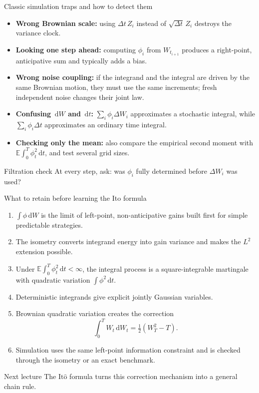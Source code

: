 \documentclass[handout,10pt,aspectratio=169]{beamer}
\newcommand{\E}{\mathbb E}
\newcommand{\dd}{\,\mathrm d}
\newcommand{\Ito}{\mathrm{It\hat{o}}}
\begin{document}
\begin{frame}{Classic simulation traps and how to detect them}
\footnotesize
\begin{itemize}\setlength{\itemsep}{0.3em}
  \item \textbf{Wrong Brownian scale:} using \(\Delta t\,Z_i\) instead of \(\sqrt{\Delta t}\,Z_i\) destroys the variance clock.
  \item \textbf{Looking one step ahead:} computing \(\phi_i\) from \(W_{t_{i+1}}\) produces a right-point, anticipative sum and typically adds a bias.
  \item \textbf{Wrong noise coupling:} if the integrand and the integral are driven by the same Brownian motion, they must use the same increments; fresh independent noise changes their joint law.
  \item \textbf{Confusing \(\dd W\) and \(\dd t\):} \(\sum_i\phi_i\Delta W_i\) approximates a stochastic integral, while \(\sum_i\phi_i\Delta t\) approximates an ordinary time integral.
  \item \textbf{Checking only the mean:} also compare the empirical second moment with \(\E\int_0^T\phi_t^2\dd t\), and test several grid sizes.
\end{itemize}
\begin{alertblock}{Filtration check}
At every step, ask: was \(\phi_i\) fully determined before \(\Delta W_i\) was used?
\end{alertblock}
\end{frame}

\begin{frame}{What to retain before learning the Ito formula}
\small
\begin{enumerate}\setlength{\itemsep}{0.25em}
  \item \(\int\phi\dd W\) is the limit of left-point, non-anticipative gains built first for simple predictable strategies.
  \item The isometry converts integrand energy into gain variance and makes the \(L^2\) extension possible.
  \item Under \(\E\int_0^T\phi_t^2\dd t<\infty\), the integral process is a square-integrable martingale with quadratic variation \(\int\phi^2\dd t\).
  \item Deterministic integrands give explicit jointly Gaussian variables.
  \item Brownian quadratic variation creates the correction
  \[
  \int_0^T W_t\dd W_t=\tfrac12(W_T^2-T).
  \]
  \item Simulation uses the same left-point information constraint and is checked through the isometry or an exact benchmark.
\end{enumerate}
\begin{block}{Next lecture}
The \(\Ito\) formula turns this correction mechanism into a general chain rule.
\end{block}
\end{frame}
\end{document}
